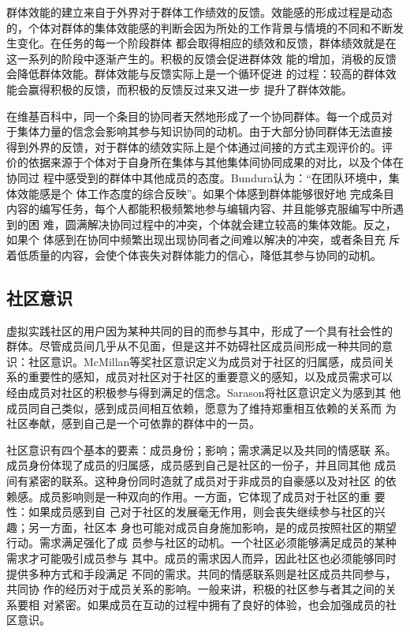 群体效能的建立来自于外界对于群体工作绩效的反馈。效能感的形成过程是动态
的，个体对群体的集体效能感的判断会因为所处的工作背景与情境的不同和不断发生变化。在任务的每一个阶段群体
都会取得相应的绩效和反馈，群体绩效就是在这一系列的阶段中逐渐产生的。积极的反馈会促进群体效
能的增加，消极的反馈会降低群体效能。群体效能与反馈实际上是一个循环促进
的过程：较高的群体效能会赢得积极的反馈，而积极的反馈反过来又进一步
提升了群体效能\cite{(Gist}。

在维基百科中，同一个条目的协同者天然地形成了一个协同群体。每一个成员对
于集体力量的信念会影响其参与知识协同的动机。由于大部分协同群体无法直接
得到外界的反馈，对于群体的绩效实际上是个体通过间接的方式主观评价的。评
价的依据来源于个体对于自身所在集体与其他集体间协同成果的对比，以及个体在协同过
程中感受到的群体中其他成员的态度。Bundura认为：“在团队环境中，集体效能感是个
体工作态度的综合反映”\cite{bundura}。如果个体感到群体能够很好地
完成条目内容的编写任务，每个人都能积极频繁地参与编辑内容、并且能够克服编写中所遇到的困
难，圆满解决协同过程中的冲突，个体就会建立较高的集体效能。反之，如果个
体感到在协同中频繁出现出现协同者之间难以解决的冲突，或者条目充
斥着低质量的内容，会使个体丧失对群体能力的信心，降低其参与协同的动机。

\subsection{社区意识}
\label{sec:sense-of-community}

虚拟实践社区的用户因为某种共同的目的而参与其中，形成了一个具有社会性的
群体。尽管成员间几乎从不见面，但是这并不妨碍社区成员间形成一种共同的意
识：社区意识。McMillan等奖社区意识定义为成员对于社区的归属感，成员间关
系的重要性的感知，成员对社区对于社区的重要意义的感知，以及成员需求可以
经由成员对社区的积极参与得到满足的信念。Sarason将社区意识定义为感到其
他成员同自己类似，感到成员间相互依赖，愿意为了维持郑重相互依赖的关系而
为社区奉献，感到自己是一个可依靠的群体中的一员。

社区意识有四个基本的要素：成员身份；影响；需求满足以及共同的情感联
系。成员身份体现了成员的归属感，成员感到自己是社区的一份子，并且同其他
成员间有紧密的联系。这种身份同时造就了成员对于非成员的自豪感以及对社区
的依赖感。成员影响则是一种双向的作用。一方面，它体现了成员对于社区的重
要性：如果成员感到自
己对于社区的发展毫无作用，则会丧失继续参与社区的兴趣；另一方面，社区本
身也可能对成员自身施加影响，是的成员按照社区的期望行动。需求满足强化了成
员参与社区的动机。一个社区必须能够满足成员的某种需求才可能吸引成员参与
其中。成员的需求因人而异，因此社区也必须能够同时提供多种方式和手段满足
不同的需求。共同的情感联系则是社区成员共同参与，共同协
作的经历对于成员关系的影响。一般来讲，积极的社区参与者其之间的关系要相
对紧密。如果成员在互动的过程中拥有了良好的体验，也会加强成员的社区意识。

